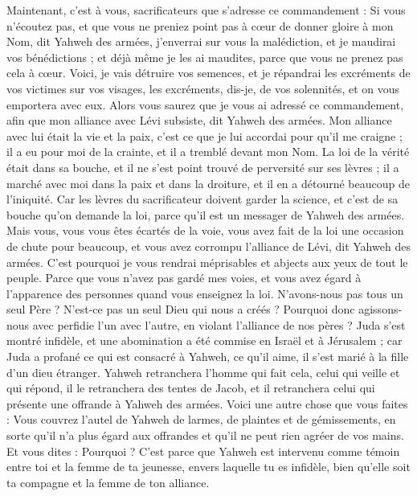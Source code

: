 \begin{multicols}{2}
\VerseOne{}Maintenant, c’est à vous, sacrificateurs que s'adresse ce commandement :
Si vous n'écoutez pas, et que vous ne preniez point pas à cœur de donner gloire à mon Nom, dit Yahweh des armées, j'enverrai sur vous la malédiction, et je maudirai vos bénédictions ; et déjà même je les ai maudites, parce que vous ne prenez pas cela à cœur.
Voici, je vais détruire vos semences, et je répandrai les excréments de vos victimes sur vos visages, les excréments, dis-je, de vos solennités, et on vous emportera avec eux.
Alors vous saurez que je vous ai adressé ce commandement, afin que mon alliance avec Lévi subsiste, dit Yahweh des armées.
Mon alliance avec lui était la vie et la paix, c’est ce que je lui accordai pour qu’il me craigne ; il a eu pour moi de la crainte, et il a tremblé devant mon Nom.
La loi de la vérité était dans sa bouche, et il ne s'est point trouvé de perversité sur ses lèvres ; il a marché avec moi dans la paix et dans la droiture, et il en a détourné beaucoup de l'iniquité.
Car les lèvres du sacrificateur doivent garder la science, et c’est de sa bouche qu’on demande la loi, parce qu'il est un messager de Yahweh des armées.
Mais vous, vous vous êtes écartés de la voie, vous avez fait de la loi une occasion de chute pour beaucoup, et vous avez corrompu l'alliance de Lévi, dit Yahweh des armées.
C'est pourquoi je vous rendrai méprisables et abjects aux yeux de tout le peuple. Parce que vous n’avez pas gardé mes voies, et vous avez égard à l'apparence des personnes quand vous enseignez la loi.
N'avons-nous pas tous un seul Père ? N’est-ce pas un seul Dieu qui nous a créés ? Pourquoi donc agissons-nous avec perfidie l’un avec l’autre, en violant l'alliance de nos pères ?
Juda s’est montré infidèle, et une abomination a été commise en Israël et à Jérusalem ; car Juda a profané ce qui est consacré à Yahweh, ce qu’il aime, il s'est marié à la fille d'un dieu étranger.
Yahweh retranchera l’homme qui fait cela, celui qui veille et qui répond, il le retranchera des tentes de Jacob, et il retranchera celui qui présente une offrande à Yahweh des armées.
Voici une autre chose que vous faites : Vous couvrez l'autel de Yahweh de larmes, de plaintes et de gémissements, en sorte qu’il n’a plus égard aux offrandes et qu’il ne peut rien agréer de vos mains.
Et vous dites : Pourquoi ? C'est parce que Yahweh est intervenu comme témoin entre toi et la femme de ta jeunesse, envers laquelle tu es infidèle, bien qu’elle soit ta compagne et la femme de ton alliance.

\end{multicols}
